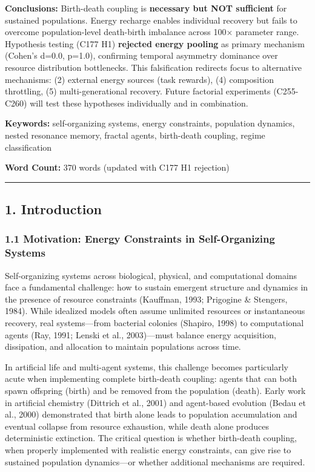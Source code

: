 \documentclass[
]{article}
\begin{document}
\textbf{Conclusions:} Birth-death coupling is \textbf{necessary but NOT
sufficient} for sustained populations. Energy recharge enables
individual recovery but fails to overcome population-level death-birth
imbalance across 100× parameter range. Hypothesis testing (C177 H1)
\textbf{rejected energy pooling} as primary mechanism (Cohen's d=0.0,
p=1.0), confirming temporal asymmetry dominance over resource
distribution bottlenecks. This falsification redirects focus to
alternative mechanisms: (2) external energy sources (task rewards), (4)
composition throttling, (5) multi-generational recovery. Future
factorial experiments (C255-C260) will test these hypotheses
individually and in combination.

\textbf{Keywords:} self-organizing systems, energy constraints,
population dynamics, nested resonance memory, fractal agents,
birth-death coupling, regime classification

\textbf{Word Count:} 370 words (updated with C177 H1 rejection)

\begin{center}\rule{0.5\linewidth}{0.5pt}\end{center}

\subsection{1. Introduction}\label{introduction}

\subsubsection{1.1 Motivation: Energy Constraints in Self-Organizing
Systems}\label{motivation-energy-constraints-in-self-organizing-systems}

Self-organizing systems across biological, physical, and computational
domains face a fundamental challenge: how to sustain emergent structure
and dynamics in the presence of resource constraints (Kauffman, 1993;
Prigogine \& Stengers, 1984). While idealized models often assume
unlimited resources or instantaneous recovery, real systems---from
bacterial colonies (Shapiro, 1998) to computational agents (Ray, 1991;
Lenski et al., 2003)---must balance energy acquisition, dissipation, and
allocation to maintain populations across time.

In artificial life and multi-agent systems, this challenge becomes
particularly acute when implementing complete birth-death coupling:
agents that can both spawn offspring (birth) and be removed from the
population (death). Early work in artificial chemistry (Dittrich et al.,
2001) and agent-based evolution (Bedau et al., 2000) demonstrated that
birth alone leads to population accumulation and eventual collapse from
resource exhaustion, while death alone produces deterministic
extinction. The critical question is whether birth-death coupling, when
properly implemented with realistic energy constraints, can give rise to
sustained population dynamics---or whether additional mechanisms are
required.
\end{document}
